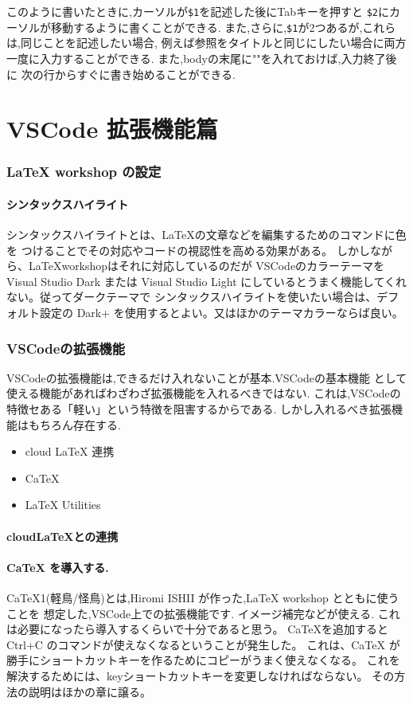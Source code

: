 \documentclass{ltjsarticle}
\begin{document}
このように書いたときに,カーソルが\verb|$1|を記述した後にTabキーを押すと
\verb|$2|にカーソルが移動するように書くことができる.
また,さらに,\verb|$1|が2つあるが,これらは,同じことを記述したい場合,
例えば参照をタイトルと同じにしたい場合に両方一度に入力することができる.
また,bodyの末尾に""を入れておけば,入力終了後に
次の行からすぐに書き始めることができる.


\part{VSCode 拡張機能篇}
\section{LaTeX workshop の設定}
\subsection{シンタックスハイライト}
シンタックスハイライトとは、LaTeXの文章などを編集するためのコマンドに色を
つけることでその対応やコードの視認性を高める効果がある。
しかしながら、\LaTeX workshopはそれに対応しているのだが
VSCodeのカラーテーマをVisual Studio Dark または Visual Studio Light
にしているとうまく機能してくれない。従ってダークテーマで
シンタックスハイライトを使いたい場合は、デフォルト設定の
Dark+ を使用するとよい。又はほかのテーマカラーならば良い。

\section{VSCodeの拡張機能}
VSCodeの拡張機能は,できるだけ入れないことが基本.VSCodeの基本機能
として使える機能があればわざわざ拡張機能を入れるべきではない.
これは,VSCodeの特徴セある「軽い」という特徴を阻害するからである.
しかし入れるべき拡張機能はもちろん存在する.
\begin{itemize}
\item cloud LaTeX 連携
\item CaTeX
\item LaTeX Utilities
\end{itemize}

\subsection{cloud\LaTeX との連携}
\subsection{CaTeX を導入する.}
CaTeX1(軽鳥/怪鳥)とは,Hiromi ISHII が作った,LaTeX workshop とともに使うことを
想定した,VSCode上での拡張機能です.
イメージ補完などが使える.
これは必要になったら導入するくらいで十分であると思う。
CaTeXを追加するとCtrl+C のコマンドが使えなくなるということが発生した。
これは、CaTeX が勝手にショートカットキーを作るためにコピーがうまく使えなくなる。
これを解決するためには、keyショートカットキーを変更しなければならない。
その方法の説明はほかの章に譲る。
\end{document}
